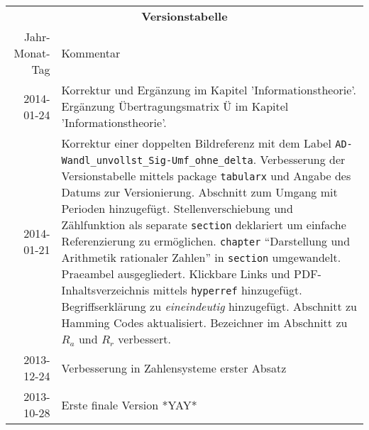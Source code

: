 \begin{table}[htp]
\centering
\begin{tabularx}{\columnwidth}{rp{}}
\multicolumn{2}{c}{\textbf{Versionstabelle}} \\
Jahr-Monat-Tag & Kommentar \\ \hline
2014-01-24 & Korrektur und Ergänzung im Kapitel 'Informationstheorie'. 
Ergänzung Übertragungsmatrix $Ü$ im Kapitel 'Informationstheorie'.
\\
2014-01-21 & Korrektur einer doppelten Bildreferenz mit dem Label \texttt{AD-Wandl\_unvollst\_Sig-Umf\_ohne\_delta}.  
Verbesserung der Versionstabelle mittels package \texttt{tabularx} und Angabe des Datums zur Versionierung. 
Abschnitt zum Umgang mit Perioden hinzugefügt. 
Stellenverschiebung und Zählfunktion als separate \texttt{section} deklariert um einfache Referenzierung zu ermöglichen.
\texttt{chapter} "`Darstellung und Arithmetik rationaler Zahlen"' in \texttt{section} umgewandelt. 
Praeambel ausgegliedert.
Klickbare Links und PDF-Inhaltsverzeichnis mittels \texttt{hyperref} hinzugefügt.
Begriffserklärung zu \emph{eineindeutig} hinzugefügt.
Abschnitt zu Hamming Codes aktualisiert.
Bezeichner im Abschnitt zu $R_a$ und $R_r$ verbessert.
\\
2013-12-24 & Verbesserung in Zahlensysteme erster Absatz \\
2013-10-28 & Erste finale Version *YAY* \\
\end{tabularx}
\end{table}